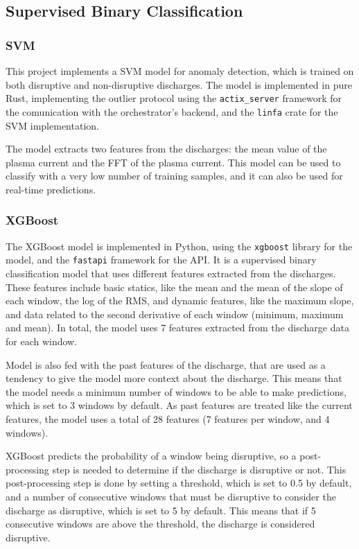 \subsection{Supervised Binary Classification}

\subsubsection{\acs{SVM}}

This project implements a \ac{SVM} model for anomaly detection, which is trained on both disruptive and non-disruptive discharges. The model is implemented in pure Rust, implementing the outlier protocol using the \texttt{actix\_server} framework for the comunication with the orchestrator's backend, and the \texttt{linfa} crate for the \ac{SVM} implementation. 

The model extracts two features from the discharges: the mean value of the plasma current and the \ac{FFT} of the plasma current. This model can be used to classify with a very low number of training samples, and it can also be used for real-time predictions.

\subsubsection{XGBoost}

The XGBoost model is implemented in Python, using the \texttt{xgboost} library for the model, and the \texttt{fastapi} framework for the API. It is a supervised binary classification model that uses different features extracted from the discharges. These features include basic statics, like the mean and the mean of the slope of each window, the log of the \ac{RMS}, and dynamic features, like the maximum slope, and data related to the second derivative of each window (minimum, maximum and mean). In total, the model uses 7 features extracted from the discharge data for each window.

Model is also fed with the past features of the discharge, that are used as a tendency to give the model more context about the discharge. This means that the model needs a minimum number of windows to be able to make predictions, which is set to 3 windows by default. As past features are treated like the current features, the model uses a total of 28 features (7 features per window, and 4 windows).

XGBoost predicts the probability of a window being disruptive, so a post-processing step is needed to determine if the discharge is disruptive or not. This post-processing step is done by setting a threshold, which is set to 0.5 by default, and a number of consecutive windows that must be disruptive to consider the discharge as disruptive, which is set to 5 by default. This means that if 5 consecutive windows are above the threshold, the discharge is considered disruptive.



